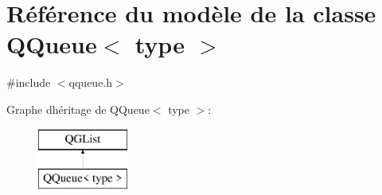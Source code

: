 \hypertarget{class_q_queue}{}\section{Référence du modèle de la classe Q\+Queue$<$ type $>$}
\label{class_q_queue}


{\ttfamily \#include $<$qqueue.\+h$>$}

Graphe d\textquotesingle{}héritage de Q\+Queue$<$ type $>$\+:\begin{figure}[H]
\begin{center}
\leavevmode
\includegraphics[height=2.000000cm]{class_q_queue}
\end{center}
\end{figure}
